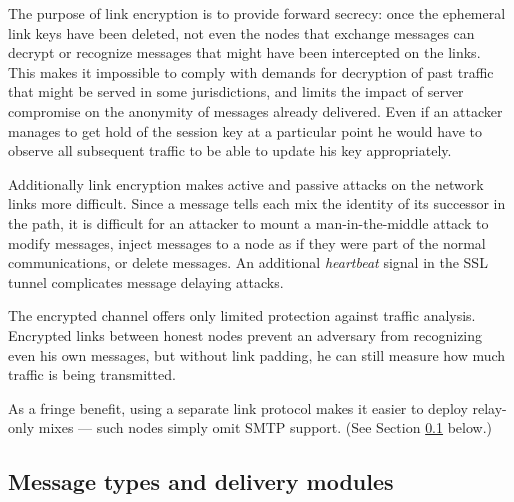 \documentclass[11pt]{IEEEtran}
\begin{document}
The purpose of link encryption is to provide forward secrecy: 
once the ephemeral link keys have been deleted, not even the
nodes that exchange messages can decrypt or recognize messages
that might have been intercepted on the links. This makes it
impossible to comply with demands for decryption of past traffic 
that might be served in
some jurisdictions, and limits the impact of server compromise on the
anonymity 
of messages already delivered.
Even if an
attacker manages to get hold of the session key at a particular point
he would have to observe all subsequent traffic to be able to update
his key appropriately.

Additionally link encryption makes active and passive attacks on the
network links more difficult. Since a message tells each mix the identity
of its successor in the path, it is difficult for an attacker to
mount a man-in-the-middle attack to modify messages, inject messages
to a node as if they were part of the normal communications, or delete
messages.  An additional \emph{heartbeat} signal in the SSL tunnel
complicates message delaying attacks.

The encrypted channel offers only limited protection against traffic
analysis. Encrypted links between honest nodes prevent an adversary
from recognizing even his own messages, but without link padding, he
can still measure how much traffic is being transmitted.

As a fringe benefit, using a separate link protocol makes it
easier to deploy relay-only mixes --- such nodes simply omit SMTP
support.  (See Section \ref{subsec:delivery-modules} below.)

\subsection{Message types and delivery modules}
\label{subsec:delivery-modules}
\end{document}
